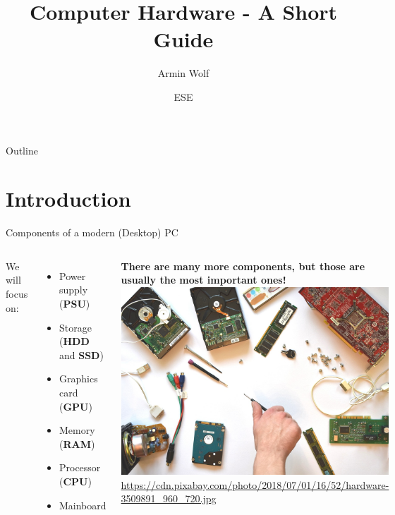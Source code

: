 \documentclass[10pt, graphics, aspectratio=169, table]{beamer}
\title{Computer Hardware - A Short Guide}
\author{Armin Wolf}
\date{ESE \the\year{}}
\institute{Nerd::101 - ESE - ifsr - TU Dresden}
\begin{document}
    \maketitle

    \begin{frame}{Outline}
        \tableofcontents
    \end{frame}


    \section{Introduction}
    \begin{frame}{Components of a modern (Desktop) PC}
        \begin{columns}
            	We will focus on:
                \begin{itemize}
                    \item Power supply (\textbf{PSU})
                    \item Storage (\textbf{HDD} and \textbf{SSD})
                    \item Graphics card (\textbf{GPU})
                    \item Memory (\textbf{RAM})
                    \item Processor (\textbf{CPU})
                    \item Mainboard
                \end{itemize}
                \textbf{There are many more components, but those are usually the most important ones!}
                \includegraphics[width=\textwidth]{img/hardware.jpg}
                \center\tiny\url{https://cdn.pixabay.com/photo/2018/07/01/16/52/hardware-3509891_960_720.jpg}
        \end{columns}
    \end{frame}
\end{document}
